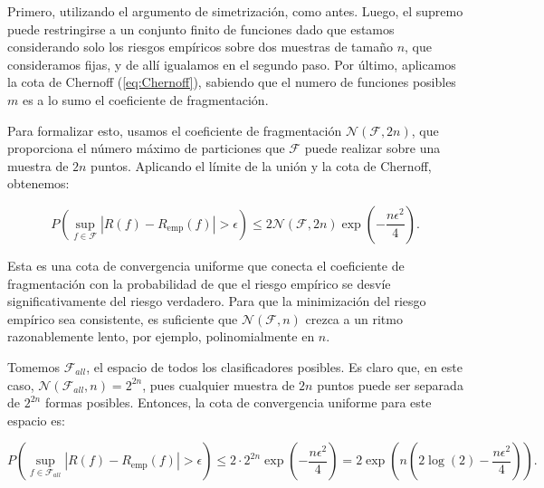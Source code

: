 \documentclass{article}
\begin{document}
Primero, utilizando el argumento de simetrización, como antes. Luego, el supremo puede restringirse a un conjunto finito de funciones
dado que estamos considerando solo los riesgos empíricos sobre dos muestras de tamaño $n$, que consideramos fijas, y de allí igualamos
en el segundo paso. Por último, aplicamos la cota de Chernoff (\ref{eq:Chernoff}), sabiendo que el numero de funciones
posibles $m$ es a lo sumo el coeficiente de fragmentación.\newline

Para formalizar esto, usamos el coeficiente de fragmentación \(\mathcal{N}(\mathcal{F}, 2n)\), que proporciona el número máximo 
de particiones que \(\mathcal{F}\) puede realizar sobre una muestra de \(2n\) puntos. Aplicando el límite de la unión 
y la cota de Chernoff, obtenemos:

\begin{equation} 
    P\left(\sup_{f \in \mathcal{F}} |R(f) - R_{\text{emp}}(f)| > \epsilon \right) \leq 
    2\mathcal{N}(\mathcal{F}, 2n) \exp\left(-\frac{n\epsilon^2}{4}\right). \label{eq: cota convergencia coeficiente fragmentacion}
\end{equation}

Esta es una cota de convergencia uniforme que conecta el coeficiente de fragmentación con la probabilidad de 
que el riesgo empírico se desvíe significativamente del riesgo verdadero. Para que la minimización del riesgo 
empírico sea consistente, es suficiente que $\mathcal{N}(\mathcal{F}, n)$ crezca a un ritmo razonablemente lento, por ejemplo, 
polinomialmente en \(n\).\newline

Tomemos $\mathcal{F}_{all}$, el espacio de todos los clasificadores posibles. Es claro que, en este caso, $\mathcal{N}(\mathcal{F}_{all}, n)=2^{2n}$,
pues cualquier muestra de $2n$ puntos puede ser separada de $2^{2n}$ formas posibles. Entonces, la cota de convergencia uniforme para este espacio
es:

\[
P\left(\sup_{f \in \mathcal{F}_{all}} |R(f) - R_{\text{emp}}(f)| > \epsilon \right) \leq
2\cdot 2^{2n} \exp\left(-\frac{n\epsilon^2}{4}\right) = 2\exp\left(n\left( 2\log(2) - \frac{n\epsilon^2}{4}\right)\right).
\]
\end{document}
